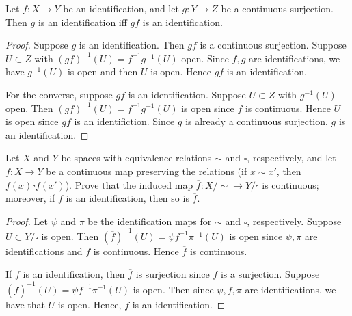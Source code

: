 \documentclass{article}
\begin{document}
 Let $f:X \to Y$ be an identification, and let $g: Y \to Z$ be a continuous surjection.
Then $g$ is an identification iff $gf$ is an identification.

\begin{proof}
Suppose $g$ is an identification. Then $gf$ is a continuous surjection.
Suppose $U \subset Z$ with $(gf)^{-1}(U) = f^{-1} g^{-1}(U)$ open. Since $f,g$ are identifications,
we have $g^{-1}(U)$ is open and then $U$ is open. Hence $gf$ is an identification.

For the converse, suppose $gf$ is an identification.  Suppose $U \subset Z$ with $g^{-1}(U)$ open.
Then $(gf)^{-1}(U) = f^{-1}g^{-1}(U)$ is open since $f$ is continuous.  Hence $U$ is open since $gf$
is an identifiction. Since $g$ is already a continuous surjection, $g$ is an identification.
\end{proof}


 Let $X$ and $Y$ be spaces with equivalence relations $\sim$ and $\square$, respectively, and
let $f: X \to Y$ be a continuous map preserving the relations (if $x \sim x'$, then $f(x) \square f(x')$).
Prove that the induced map $\overline f: X/\sim \to Y / \square$ is continuous; moreover, if
$f$ is an identification, then so is $\overline f$.

\begin{proof}
Let $\psi$ and $\pi$ be the identification maps for $\sim$ and $\square$, respectively. Suppose
$U \subset Y / \square$ is open.  Then $(\overline f)^{-1}(U) = \psi f^{-1} \pi^{-1}(U)$ is open
since $\psi, \pi$ are identifications and $f$ is continuous. Hence $\overline f$ is continuous.

If $f$ is an identification, then $\overline f$ is surjection since $f$ is a surjection.
Suppose $(\overline f)^{-1}(U) = \psi f^{-1} \pi^{-1}(U)$ is open.  Then since $\psi, f, \pi$ are
identifications, we have that $U$ is open.  Hence, $\overline f$ is an identification.
\end{proof}
\end{document}
